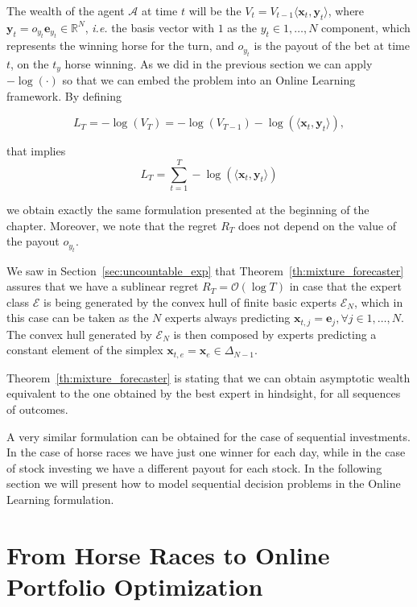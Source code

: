 The wealth of the agent $\mathcal A$ at time $t$ will be the $V_t=V_{t-1}\langle \mathbf x_t, \mathbf y_t \rangle$, where $\mathbf y_t=o_{y_t}\mathbf e_{y_t}\in\mathbb R^N$, \emph{i.e.} the basis vector with $1$ as the $y_t\in1,\ldots,N$ component, which represents the winning horse for the turn, and $o_{y_t}$ is the payout of the bet at time $t$, on the $t_y$ horse winning. As we did in the previous section we can apply $-\log(\cdot)$ so that we can embed the problem into an Online Learning framework. By defining 

$$L_T=-\log(V_T)=-\log(V_{T-1})-\log(\langle \mathbf x_t,\mathbf y_t\rangle),$$

that implies 
\begin{equation}\label{eq:log_loss_hr}
L_T=\sum\limits_{t=1}^T-\log(\langle \mathbf x_t,\mathbf y_t\rangle)
\end{equation}

we obtain exactly the same formulation presented at the beginning of the chapter. Moreover, we note that the regret $R_T$ does not 
depend on the value of the payout $o_{y_t}$. 

We saw in Section~\ref{sec:uncountable_exp} that Theorem~\ref{th:mixture_forecaster} assures that we have a sublinear regret $R_T=\mathcal O(\log T)$ in case that the expert class $\mathcal E$ is being generated by the convex hull of finite basic experts $\mathcal E_N$, which in this case can be taken as the $N$ experts always predicting $\mathbf x_{t,j}=\mathbf e_j, \forall j\in 1,\ldots,N$. The convex hull generated by $\mathcal E_N$ is then composed by experts predicting a constant element of the simplex $\mathbf x_{t,e}=\mathbf x_e\in \Delta_{N-1}$. 

Theorem~\ref{th:mixture_forecaster} is stating that we can obtain asymptotic wealth equivalent to the one obtained by the best expert in hindsight, for all sequences of outcomes. 

A very similar formulation can be obtained for the case of sequential investments. In the case of horse races we have just one winner for each day, while in the case of stock investing we have a different payout for each stock. In the following section we will present how to model sequential decision problems in the Online Learning formulation.

\section{From Horse Races to Online Portfolio Optimization}\label{sec:from_horse_to_ptf}

